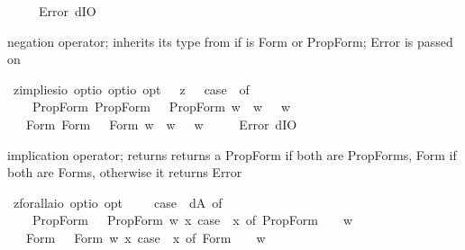 \begin{isabellebody}
\ \ {\isacharbar}\ {\isacharunderscore}\ {\isasymRightarrow}\ Error\ dIO{\isachardoublequoteclose}%
\begin{isamarkuptext}%
negation operator;  inherits its type from \isa{{\isasymphi}} if \isa{{\isasymphi}} is Form or PropForm; 
Error is passed on%
\end{isamarkuptext}%
\isamarkuptrue%
\isamarkupfalse%
\ z{\isacharunderscore}implies{\isacharcolon}{\isacharcolon}{\isachardoublequoteopen}io\ opt{\isasymRightarrow}io\ opt{\isasymRightarrow}io\ opt{\isachardoublequoteclose}\ \ {\isachardoublequoteopen}{\isasymphi}\ {\isasymrightarrow}\isactrlsup z\ {\isasympsi}\ {\isasymequiv}\ case\ {\isacharparenleft}{\isasymphi}{\isacharcomma}{\isasympsi}{\isacharparenright}\ of\ \isanewline
\ \ \ \ {\isacharparenleft}PropForm\ {\isasymalpha}{\isacharcomma}PropForm\ {\isasymbeta}{\isacharparenright}\ {\isasymRightarrow}\ PropForm\ {\isacharparenleft}{\isasymlambda}w{\isachardot}\ {\isasymalpha}\ w\ {\isasymlongrightarrow}\ {\isasymbeta}\ w{\isacharparenright}\isanewline
\ \ {\isacharbar}\ {\isacharparenleft}Form\ {\isasymalpha}{\isacharcomma}Form\ {\isasymbeta}{\isacharparenright}\ {\isasymRightarrow}\ Form\ {\isacharparenleft}{\isasymlambda}w{\isachardot}\ {\isasymalpha}\ w\ {\isasymlongrightarrow}\ {\isasymbeta}\ w{\isacharparenright}\isanewline
\ \ {\isacharbar}\ {\isacharunderscore}\ {\isasymRightarrow}\ Error\ dIO{\isachardoublequoteclose}%
\begin{isamarkuptext}%
implication operator;  returns returns a PropForm if both are PropForms, Form if both are Forms,
otherwise it returns Error%
\end{isamarkuptext}%
\isamarkuptrue%
\isamarkupfalse%
\ z{\isacharunderscore}forall{\isacharcolon}{\isacharcolon}{\isachardoublequoteopen}{\isacharparenleft}{\isacharprime}a{\isasymRightarrow}io\ opt{\isacharparenright}{\isasymRightarrow}io\ opt{\isachardoublequoteclose}\ \ {\isachardoublequoteopen}{\isasymforall}\ {\isasymPhi}\ {\isasymequiv}\ case\ {\isacharparenleft}{\isasymPhi}\ dA{\isacharparenright}\ of\isanewline
\ \ \ \ PropForm\ {\isasymphi}\ {\isasymRightarrow}\ PropForm\ {\isacharparenleft}{\isasymlambda}w{\isachardot}\ {\isasymforall}x{\isachardot}\ case\ {\isacharparenleft}{\isasymPhi}\ x{\isacharparenright}\ of\ PropForm\ {\isasympsi}\ {\isasymRightarrow}\ {\isasympsi}\ w{\isacharparenright}\isanewline
\ \ {\isacharbar}\ Form\ {\isasymphi}\ {\isasymRightarrow}\ Form\ {\isacharparenleft}{\isasymlambda}w{\isachardot}\ {\isasymforall}x{\isachardot}\ case\ {\isacharparenleft}{\isasymPhi}\ x{\isacharparenright}\ of\ Form\ {\isasympsi}\ {\isasymRightarrow}\ {\isasympsi}\ w{\isacharparenright}\isanewline

\end{isabellebody}
